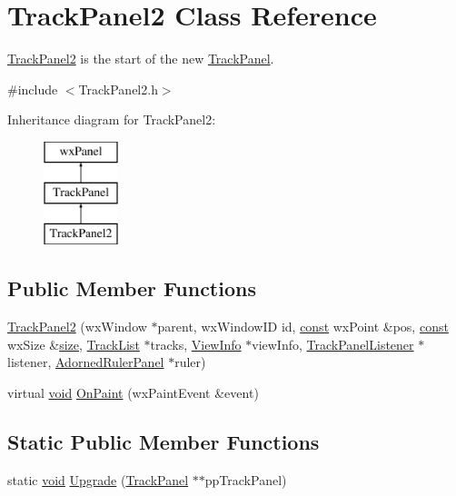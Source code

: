 \hypertarget{class_track_panel2}{}\section{Track\+Panel2 Class Reference}
\label{class_track_panel2}


\hyperlink{class_track_panel2}{Track\+Panel2} is the start of the new \hyperlink{class_track_panel}{Track\+Panel}.  




{\ttfamily \#include $<$Track\+Panel2.\+h$>$}

Inheritance diagram for Track\+Panel2\+:\begin{figure}[H]
\begin{center}
\leavevmode
\includegraphics[height=3.000000cm]{class_track_panel2}
\end{center}
\end{figure}
\subsection*{Public Member Functions}
\begin{DoxyCompactItemize}
\item 
\hyperlink{class_track_panel2_a74d476a8909ddad80c30b5535bdeb453}{Track\+Panel2} (wx\+Window $\ast$parent, wx\+Window\+ID id, \hyperlink{getopt1_8c_a2c212835823e3c54a8ab6d95c652660e}{const} wx\+Point \&pos, \hyperlink{getopt1_8c_a2c212835823e3c54a8ab6d95c652660e}{const} wx\+Size \&\hyperlink{group__lavu__mem_ga854352f53b148adc24983a58a1866d66}{size}, \hyperlink{class_track_list}{Track\+List} $\ast$tracks, \hyperlink{class_view_info}{View\+Info} $\ast$view\+Info, \hyperlink{class_track_panel_listener}{Track\+Panel\+Listener} $\ast$listener, \hyperlink{class_adorned_ruler_panel}{Adorned\+Ruler\+Panel} $\ast$ruler)
\item 
virtual \hyperlink{sound_8c_ae35f5844602719cf66324f4de2a658b3}{void} \hyperlink{class_track_panel2_aa0328958f63b998fec61f76b28759c56}{On\+Paint} (wx\+Paint\+Event \&event)
\end{DoxyCompactItemize}
\subsection*{Static Public Member Functions}
\begin{DoxyCompactItemize}
\item 
static \hyperlink{sound_8c_ae35f5844602719cf66324f4de2a658b3}{void} \hyperlink{class_track_panel2_a852a1b8904c0d136cdba7d0d7e12d26e}{Upgrade} (\hyperlink{class_track_panel}{Track\+Panel} $\ast$$\ast$pp\+Track\+Panel)
\end{DoxyCompactItemize}
